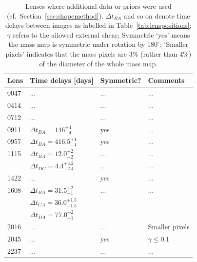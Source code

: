 \documentclass[useAMS,usenatbib]{mn2e}
\begin{document}
\begin{table}
  \begin{center} \begin{tabular}{l l l l}
      Lens & Time delays [days] & Symmetric? & Comments \\ \hline
      0047 & ... & ... & ... \\
      0414 & ... & ... & ... \\
      0712 & ... & ... & ... \\
      0911 & $\Delta t_{BA}=146^{+4}_{-4}$ & yes & ... \\
      0957 & $\Delta t_{BA}=416.5^{+1}_{-1}$ & yes & ... \\
      1115 & $\Delta t_{BA}=12.0^{+2}_{-2}$ & ... & ... \\
           & $\Delta t_{DC}=4.4^{+3.2}_{-2.4}$ & ... & ... \\
      1422 & ... & yes & ... \\
      1608 & $\Delta t_{BA}=31.5^{+2}_{-1}$ & ... & ... \\
           & $\Delta t_{CA}=36.0^{+1.5}_{-1.5}$ & \\
           & $\Delta t_{DA}=77.0^{+2}_{-1}$ & \\
      2016 & ... & ... & Smaller pixels \\
      2045 & ... & yes & $\gamma\leq 0.1$ \\
      2237 & ... & ... & ... \\
    \end{tabular}
    \caption[width=\linewidth]{Lenses where additional data or priors were used (cf.~Section~\ref{sec:shapemethod}). $\Delta t_{BA}$ and so on denote time delays between images as labelled in Table~\ref{tab:lenspositions}; $\gamma$ refers to the allowed external shear; Symmetric `yes' means the mass map is symmetric under rotation by $180^\circ$; `Smaller pixels' indicates that the mass pixels are 3\% (rather than 4\%) of the diameter of the whole mass map.}
    \label{tab:lenspriors}
  \end{center}
\end{table}
\end{document}
